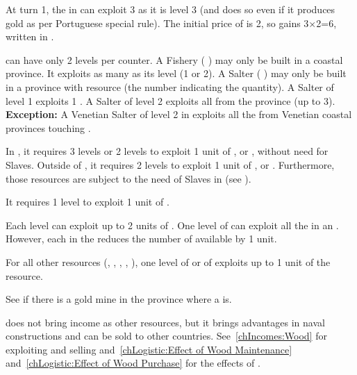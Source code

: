 \begin{exemple}
  At turn 1, the \TP in  can exploit 3 
  as it is level 3 (and does so even if it produces gold as per
  Portuguese special rule). The initial price of  is
  2\ducats, so \POR gains 3$\times$2=6\ducats, written in
  .
\end{exemple}

\aparag[Manufactures] \MNU can have only 2 levels per counter.
\bparag A Fishery ( \MNU) may only be built in a coastal
province. It exploits as many  as its level (1 or 2).
\bparag A Salter ( \MNU) may only be built in a province with
 resource (the number indicating the quantity).
\bparag A Salter of level 1 exploits 1 .
\bparag A Salter of level 2 exploits all  from the province (up to
3).
\bparag \textbf{Exception:} A Venetian Salter of level 2 in \provinceVeneto
exploits all the  from Venetian coastal provinces touching
\regionMediterranee.

\bparag In , it requires 3 \TP levels or 2 \COL levels to
exploit 1 unit of ,  or ,
without need for Slaves.
\bparag Outside of , it requires 2 \COL levels to exploit 1
unit of ,  or . Furthermore,
those resources are subject to the need of Slaves in  (see
).

\aparag[Fish.] It requires 1 \COL level to exploit 1 unit of .

\aparag[Fur.]
\bparag Each \TP level can exploit up to 2 units of .
\bparag One level of \COL can exploit all the  in an
\Area. However, each \COL\faceplus in the \Area reduces the number of
available  by 1 unit.

 For all other resources (,
, , , ), one level of \COL or of
\TP exploits up to 1 unit of the resource.

\aparag[Gold.] See  if there is a gold mine in
the province where a \COL is.

\aparag[Wood.]  does not bring income as other resources, but
it brings advantages in naval constructions and can be sold to other
countries. See~\ref{chIncomes:Wood} for exploiting and selling
 and~\ref{chLogistic:Effect of Wood Maintenance}
and~\ref{chLogistic:Effect of Wood Purchase} for the effects of
.

